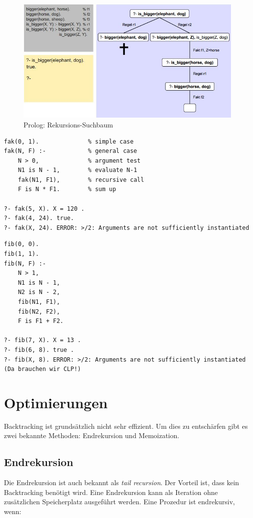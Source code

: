 \begin{figure}[h!]
\centering
\includegraphics[width=0.7\linewidth]{fig/prolog-suchbaum-rekursion}
\caption{Prolog: Rekursions-Suchbaum}
\label{fig:prolog-suchbaum-rekursion}
\end{figure}

\begin{lstlisting}[caption=Fakultät]
fak(0, 1). 				% simple case
fak(N, F) :- 			% general case
	N > 0, 				% argument test
	N1 is N - 1, 		% evaluate N-1
	fak(N1, F1), 		% recursive call
	F is N * F1. 		% sum up

?- fak(5, X). X = 120 .
?- fak(4, 24). true.
?- fak(X, 24). ERROR: >/2: Arguments are not sufficiently instantiated
\end{lstlisting}

\begin{lstlisting}[caption=Fibonacci, label=lst:naiv-fib]
% Naive Implementierung! Optimierung mittels Endrekursion und Assertions.
fib(0, 0).
fib(1, 1).
fib(N, F) :-
	N > 1,
	N1 is N - 1,
	N2 is N - 2,
	fib(N1, F1),
	fib(N2, F2),
	F is F1 + F2.

?- fib(7, X). X = 13 .
?- fib(6, 8). true .
?- fib(X, 8). ERROR: >/2: Arguments are not sufficiently instantiated (Da brauchen wir CLP!)
\end{lstlisting}

\section{Optimierungen}

Backtracking ist grundsätzlich nicht sehr effizient. Um dies zu entschärfen gibt es zwei bekannte Methoden: Endrekursion und Memoization.

\subsection{Endrekursion}
Die Endrekursion ist auch bekannt als \emph{tail recursion}. Der Vorteil ist, dass kein Backtracking benötigt wird. Eine Endrekursion kann als Iteration ohne zusätzlichen Speicherplatz ausgeführt werden. Eine Prozedur ist endrekursiv, wenn:

